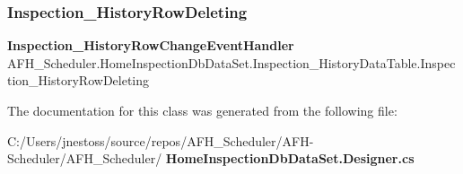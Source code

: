 \subsubsection{Inspection\_HistoryRowDeleting}
{\footnotesize\ttfamily \textbf{ Inspection\+\_\+\+History\+Row\+Change\+Event\+Handler} A\+F\+H\+\_\+\+Scheduler.\+Home\+Inspection\+Db\+Data\+Set.\+Inspection\+\_\+\+History\+Data\+Table.\+Inspection\+\_\+\+History\+Row\+Deleting}



The documentation for this class was generated from the following file\+:\begin{DoxyCompactItemize}
\item 
C\+:/\+Users/jnestoss/source/repos/\+A\+F\+H\+\_\+\+Scheduler/\+A\+F\+H-\/\+Scheduler/\+A\+F\+H\+\_\+\+Scheduler/\textbf{ Home\+Inspection\+Db\+Data\+Set.\+Designer.\+cs}\end{DoxyCompactItemize}
